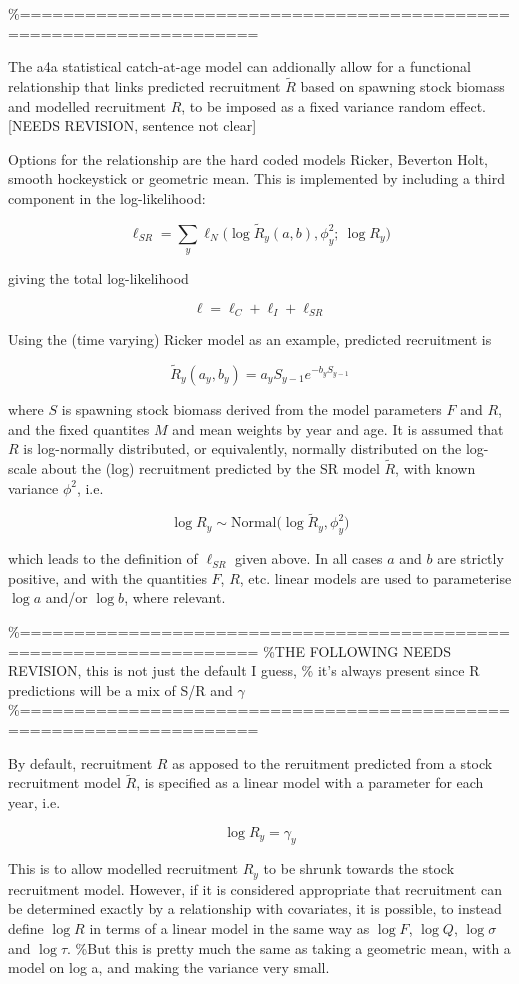 \documentclass[
]{book}
\begin{document}
\%====================================================================

The a4a statistical catch-at-age model can addionally allow for a functional relationship that links predicted recruitment \(\tilde{R}\) based on spawning stock biomass and modelled recruitment \(R\), to be imposed as a fixed variance random effect. {[}NEEDS REVISION, sentence not clear{]}

Options for the relationship are the hard coded models Ricker, Beverton Holt, smooth hockeystick or geometric mean. This is implemented by including a third component in the log-likelihood:

\[\ell_{SR} = \sum_y \ell_N \Big( \log \tilde{R}_y(a, b), \phi_y^2 ;\ \log R_y \Big)\]

giving the total log-likelihood

\[\ell = \ell_C + \ell_I + \ell_{SR}\]

Using the (time varying) Ricker model as an example, predicted recruitment is

\[\tilde{R}_y(a_y,b_y) = a_y S_{y-1} e^{-b_y S_{y-1}}\]

where \(S\) is spawning stock biomass derived from the model parameters \(F\) and \(R\), and the fixed quantites \(M\) and mean weights by year and age. It is assumed that \(R\) is log-normally distributed, or equivalently, normally distributed on the log-scale about the (log) recruitment predicted by the SR model \(\tilde{R}\), with known variance \(\phi^2\), i.e.

\[\log R_y \sim \text{Normal} \Big( \log \tilde{R}_y, \phi_y^2 \Big)\]

which leads to the definition of \(\ell_{SR}\) given above. In all cases \(a\) and \(b\) are strictly positive, and with the quantities \(F\), \(R\), etc. linear models are used to parameterise \(\log a\) and/or \(\log b\), where relevant.

\%====================================================================
\%THE FOLLOWING NEEDS REVISION, this is not just the default I guess,
\% it's always present since R predictions will be a mix of S/R and \(\gamma\)
\%====================================================================

By default, recruitment \(R\) as apposed to the reruitment predicted from a stock recruitment model \(\tilde{R}\), is specified as a linear model with a parameter for each year, i.e.

\[\log R_y = \gamma_y\]

This is to allow modelled recruitment \(R_y\) to be shrunk towards the stock recruitment model. However, if it is considered appropriate that recruitment can be determined exactly by a relationship with covariates, it is possible, to instead define \(\log R\) in terms of a linear model in the same way as \(\log F\), \(\log Q\), \(\log \sigma\) and \(\log \tau\). \%But this is pretty much the same as taking a geometric mean, with a model on log a, and making the variance very small.
\end{document}
